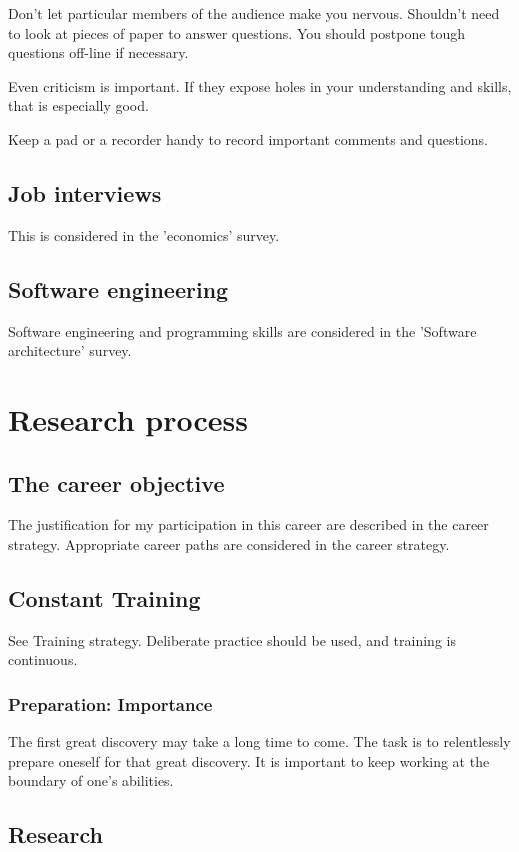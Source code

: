 \documentclass[oneside, article]{memoir}
\begin{document}
Don't let particular members of the audience make you nervous. Shouldn't need to look at pieces of paper to answer questions. You should postpone tough questions off-line if necessary.

Even criticism is important. If they expose holes in your understanding and skills, that is especially good.

Keep a pad or a recorder handy to record important comments and questions.

\chapter{Job interviews}
This is considered in the 'economics' survey.

\chapter{Software engineering}
Software engineering and programming skills are considered in the 'Software architecture' survey.

\part{Research process}
\chapter{The career objective}
The justification for my participation in this career are described in the career strategy. Appropriate career paths are considered in the career strategy.

\chapter{Constant Training}
See Training strategy. Deliberate practice should be used, and training is continuous.

\section{Preparation: Importance}
The first great discovery may take a long time to come. The task is to relentlessly prepare oneself for that great discovery. It is important to keep working at the boundary of one’s abilities.

\chapter{Research}
\end{document}
